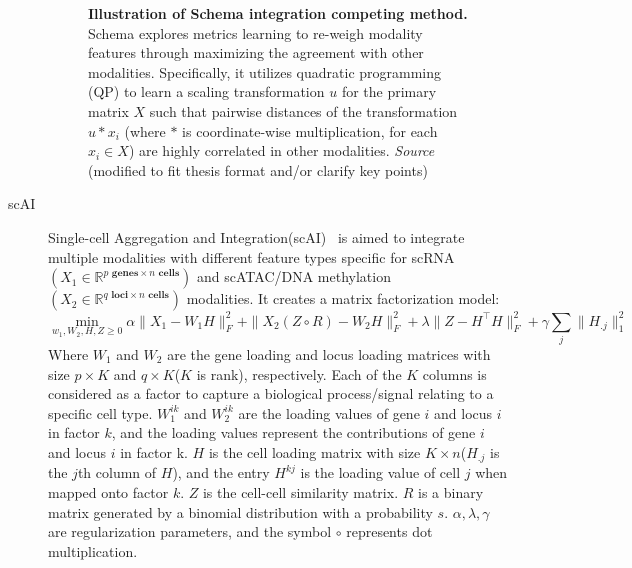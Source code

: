 \begin{description}
\begin{figure}[!ht]
    	\vspace{0.1cm}
    	\caption[Illustration of Schema integration competing method.]{\textbf{Illustration of Schema integration competing method.} Schema explores metrics learning to re-weigh modality features through maximizing the agreement with other modalities. Specifically, it utilizes quadratic programming (QP) to learn a scaling transformation $u$ for the primary matrix $X$ such that pairwise distances of the transformation $u * x_i$ (where $*$ is coordinate-wise multiplication, for each $x_i\in X$) are highly correlated in other modalities. \emph{Source~\cite{singh2021schema}} (modified to fit thesis format and/or clarify key points)
    }
    	\label{fig:Alg_Schema}
    \end{figure}
    \item[scAI]
    Single-cell Aggregation and Integration(scAI)~\citep{jin2020scai} is aimed to integrate multiple modalities with different feature types specific for scRNA $(X_1\in \mathbb{R}^{p \textbf{ genes} \times n \textbf{ cells}})$ and scATAC/DNA methylation$(X_2\in \mathbb{R}^{q \textbf{ loci}\times n \textbf{ cells}})$ modalities. It creates a matrix factorization model:
    \begin{equation}
    \min_{w_1,W_2,H,Z\geq 0} \alpha \|X_1-W_1H\|_F^2 + \|X_2(Z \circ R)-W_2H\|_F^2 + \lambda \|Z-H^\top H\|_F^2 + \gamma\sum_j \|H_{.j}\|_1^2
    \end{equation}
    Where $W_1$ and $W_2$ are the gene loading and locus loading matrices with size $p\times K$ and $q\times K$($K$ is rank), respectively. Each of the $K$ columns is considered as a factor to capture a biological process/signal relating to a specific cell type. $W_1^{ik}$ and $W_2^{ik}$ are the loading values of gene $i$ and locus $i$ in factor $k$, and the loading values represent the contributions of gene $i$ and locus $i$ in factor k. $H$ is the cell loading matrix with size $K\times n$($H_{.j}$ is the $j$th column of $H$), and the entry $H^{kj}$ is the loading value of cell $j$ when mapped onto factor $k$. $Z$ is the cell-cell similarity matrix. $R$ is a binary matrix generated by a binomial distribution with a probability $s$. $\alpha, \lambda, \gamma$ are regularization parameters, and the symbol $\circ$ represents dot multiplication.


\end{description}
